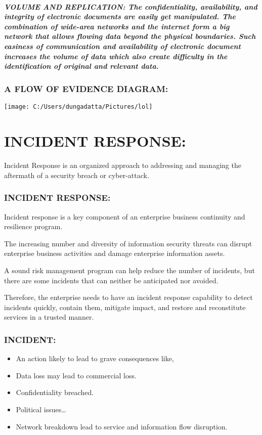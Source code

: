 \documentclass[10pt,british,english]{article}
\begin{document}
\subsubsection{VOLUME AND REPLICATION: The confidentiality, availability, and integrity
of electronic documents are easily get manipulated. The combination
of wide-area networks and the internet form a big network that allows
flowing data beyond the physical boundaries. Such easiness of communication
and availability of electronic document increases the volume of data
which also create difficulty in the identification of original and
relevant data.}

\section{A FLOW OF EVIDENCE DIAGRAM:}

\texttt{[image: C:/Users/dungadatta/Pictures/lol]}

\part{INCIDENT RESPONSE: }

Incident Response is an organized approach to addressing and managing
the aftermath of a security breach or cyber-attack.

\section{INCIDENT RESPONSE:}

Incident response is a key component of an enterprise business continuity
and resilience program. 

The increasing number and diversity of information security threats
can disrupt enterprise business activities and damage enterprise information
assets. 

A sound risk management program can help reduce the number of incidents,
but there are some incidents that can neither be anticipated nor avoided. 

Therefore, the enterprise needs to have an incident response capability
to detect incidents quickly, contain them, mitigate impact, and restore
and reconstitute services in a trusted manner.

\section{INCIDENT: }
\begin{itemize}
\item An action likely to lead to grave consequences like,
\item Data loss may lead to commercial loss.
\item Confidentiality breached.
\item Political issues\dots{}
\item Network breakdown lead to service and information flow disruption.
\end{itemize}
\end{document}
